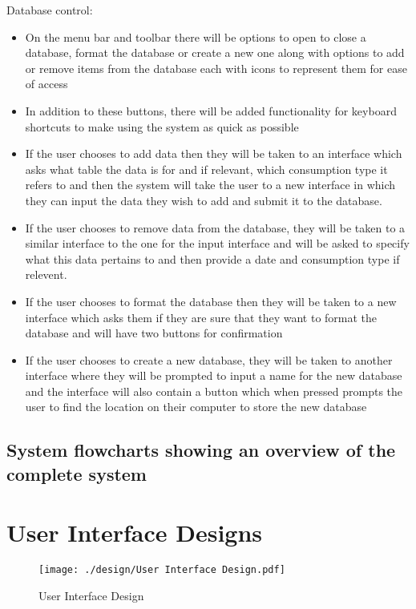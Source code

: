 Database control:
\begin{itemize}
\item{On the menu bar and toolbar there will be options to open to close a database, format the database  or create a new one along with options to add or remove items from the database each with icons to represent them for ease of access}
\item{In addition to these buttons, there will be added functionality for keyboard shortcuts to make using the system as quick as possible}
\item{If the user chooses to add data then they will be taken to an interface which asks what table the data is for and if relevant, which consumption type it refers to and then the system will take the user to a new interface in which they can input the data they wish to add and submit it to the database.}
\item{If the user chooses to remove data from the database, they will be taken to a similar interface to the one for the input interface and will be asked to specify what this data pertains to and then provide a date and consumption type if relevent.}
\item{If the user chooses to format the database then they will be taken to a new interface which asks them if they are sure that they want to format the database and will have two buttons for confirmation}
\item{If the user chooses to create a new database, they will be taken to another interface where they will be prompted to input a name for the new database and the interface will also contain a button which when pressed prompts the user to find the location on their computer to store the new database}
\end{itemize}

\subsection{System flowcharts showing an overview of the complete system}

\section{User Interface Designs}
\begin{landscape}
\begin{figure}[H]
\texttt{[image: ./design/User Interface Design.pdf]}
\caption{User Interface Design}
\end{figure}
\end{landscape}

